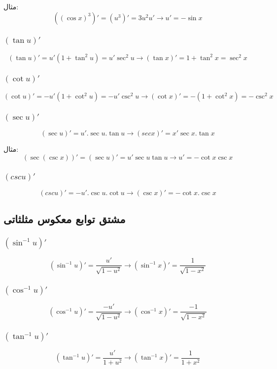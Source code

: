 مثال:
\[ ((\cos x)^3)' = (u^3)' = 3u^2u' \to u' = -\sin x \]

\subsubsection{$(\tan u)'$}
\[ (\tan u)' = u'(1+\tan^2u) = u'\sec^2u \to (\tan x)' = 1+\tan^2 x = \sec^2 x \]

\subsubsection{$(\cot u)'$}
\[ (\cot u)' = -u'(1+\cot^2u) = -u'\csc^2u \to (\cot x)' = -(1+\cot^2x) = -\csc^2x \]

\subsubsection{$(\sec u)'$}
\[ (\sec u)' = u'.\sec u.\tan u \to (sec x)' = x'\sec x.\tan x \]

مثال:
\[ (\sec(\csc x))' = (\sec u)' = u'\sec u\tan u \to u' = -\cot x \csc x \]


\subsubsection{$(csc u)'$}
\[ (csc u)' = -u'.\csc u.\cot u \to (\csc x)' = -\cot x.\csc x \]


\subsection{مشتق توابع معکوس مثلثاتی}
\subsubsection{$(\sin^{-1} u)'$}
\[ (\sin^{-1} u)' = \frac{u'}{\sqrt{1-u^2}} \to (\sin^{-1}x)' = \frac{1}{\sqrt{1-x^2}} \]

\subsubsection{$(\cos^{-1} u)'$}
\[ (\cos^{-1} u)' = \frac{-u'}{\sqrt{1-u^2}} \to (\cos^{-1}x)' = \frac{-1}{\sqrt{1-x^2}} \]

\subsubsection{$(\tan^{-1} u)'$}
\[ (\tan^{-1} u)' = \frac{u'}{1+u^2} \to (\tan^{-1}x)' = \frac{1}{1+x^2} \]

